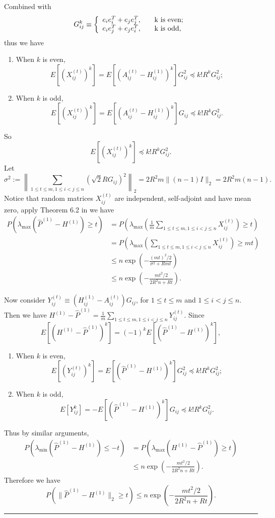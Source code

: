 \documentclass[a4paper]{article}
\newenvironment{proof}{{\bf Proof:  }}{\hfill\rule{2mm}{2mm}}
\renewcommand{\hat}{\widehat}
\begin{document}
\begin{proof}
Combined with
\[
    G_{ij}^k \equiv \left\{
    \begin{array}{l l}
        e_i e_i^T + e_j e_j^T, \quad & $k$ \text{ is even};\\
        e_i e_j^T + e_j e_i^T, \quad & $k$ \text{ is odd},
    \end{array}
    \right.
\]
thus we have
\begin{enumerate}
\item When $k$ is even,
\[
E[(X_{ij}^{(t)})^k] = E[(A^{(t)}_{ij} - H^{(1)}_{ij})^k] G_{ij}^2 \preceq k! R^k G_{ij}^2;
\]
\item When $k$ is odd,
\[
E[(X_{ij}^{(t)})^k] = E[(A^{(t)}_{ij} - H^{(1)}_{ij})^k] G_{ij} \preceq k! R^k G_{ij}^2.
\]
\end{enumerate}
So
\[
E[(X_{ij}^{(t)})^k] \preceq k! R^k G_{ij}^2.
\]
Let
\[
	\sigma^2 := \left\| \sum_{1 \le t \le m, 1 \le i < j \le n} (\sqrt{2} R G_{ij})^2 \right\|_2 = 2 R^2 m \| (n - 1) I \|_2 = 2 R^2 m (n - 1).
\]
Notice that random matrices $X_{ij}^{(t)}$ are independent, self-adjoint and have mean zero, apply Theorem 6.2 in \citep{tropp2012user} we have
\begin{align*}
	P \left( \lambda_{\max}(\hat{P}^{(1)} - H^{(1)}) \ge t \right)
	& = P \left( \lambda_{\max}\left(\frac{1}{m} \sum_{1 \le t \le m, 1 \le i < j \le n} X_{ij}^{(t)}\right) \ge t \right) \\
	& = P \left( \lambda_{\max}\left(\sum_{1 \le t \le m, 1 \le i < j \le n} X_{ij}^{(t)}\right) \ge m t \right) \\
	& \le n \exp \left( - \frac{(m t)^2/2}{\sigma^2 + R m t} \right) \\
	& \le n \exp \left( - \frac{m t^2/2}{2 R^2 n + R t} \right).
\end{align*}

Now consider $Y_{ij}^{(t)} \equiv \left( H_{ij}^{(1)} - A_{ij}^{(t)} \right) G_{ij}$, for $1 \le t \le m$ and $1 \le i < j \le n$. Then we have $H^{(1)} - \hat{P}^{(1)} = \frac{1}{m} \sum_{1 \le t \le m, 1 \le i < j \le n} Y_{ij}^{(t)}$.
Since
\[
	E[(H^{(1)} - \hat{P}^{(1)})^k]
    = (-1)^k E[(\hat{P}^{(1)} - H^{(1)})^k],
\]
\begin{enumerate}
\item When $k$ is even,
\[
E[(Y_{ij}^{(t)})^k] = E[(\hat{P}^{(1)} - H^{(1)})^k] G_{ij}^2 \preceq k! R^k G_{ij}^2;
\]
\item When $k$ is odd,
\[
E[Y_{ij}^k] = - E[(\hat{P}^{(1)} - H^{(1)})^k] G_{ij} \preceq k! R^k G_{ij}^2.
\]
\end{enumerate}
Thus by similar arguments,
\begin{align*}
	P \left( \lambda_{\min}(\hat{P}^{(1)} - H^{(1)}) \le -t \right) &
    = P \left( \lambda_{\max}(H^{(1)} - \hat{P}^{(1)}) \ge t \right) \\
    & \le n \exp \left( - \frac{m t^2/2}{2 R^2 n + R t} \right).
\end{align*}
Therefore we have
\[
	P \left( \| \hat{P}^{(1)} - H^{(1)} \|_2 \ge t \right)
    \le n \exp \left( - \frac{m t^2/2}{2 R^2 n + R t} \right).
\]


\end{proof}
\end{document}
